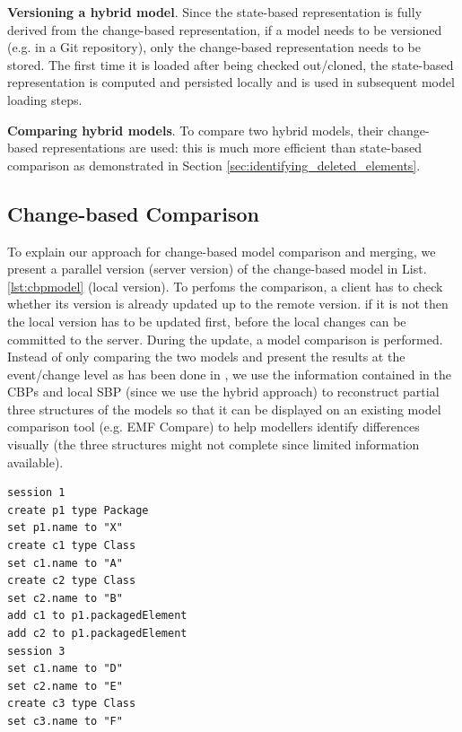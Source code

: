 \documentclass[sigplan,review,anonymous]{acmart}\settopmatter{printfolios=true,printccs=false,printacmref=false}
\begin{document}
\textbf{Versioning a hybrid model}. Since the state-based representation is fully derived from the change-based representation, if a model needs to be versioned (e.g. in a Git repository), only the change-based representation needs to be stored. The first time it is loaded after being checked out/cloned, the state-based representation is computed and persisted locally and is used in subsequent model loading steps.

\textbf{Comparing hybrid models}. To compare two hybrid models, their change-based representations are used: this is much more efficient than state-based comparison as demonstrated in Section \ref{sec:identifying_deleted_elements}.


\subsection{Change-based Comparison}
\label{sec:change-based_comparison}

To explain our approach for change-based model comparison and merging, we present a parallel version (server version) of the change-based model in List. \ref{lst:cbpmodel} (local version). To perfoms the comparison, a client has to check whether its version is already updated up to the remote version. if it is not then the local version has to be updated first, before the local changes can be committed to the server. During the update, a model comparison is performed. Instead of only comparing the two models and present the results at the event/change level as has been done in \cite{koegel2010emfstore}, we use the information contained in the CBPs and local  SBP (since we use the hybrid approach) to reconstruct partial three structures of the models so that it can be displayed on an existing model comparison tool (e.g. EMF Compare) to help modellers identify differences visually (the three structures might not complete since limited information available).  

\begin{lstlisting}[style=eol,caption={A parallel version of the CBP in List. \ref{lst:cbpmodel}.},label=lst:cbpmodel_parallel]
session 1
create p1 type Package
set p1.name to "X" 
create c1 type Class
set c1.name to "A"
create c2 type Class
set c2.name to "B"
add c1 to p1.packagedElement 
add c2 to p1.packagedElement
session 3
set c1.name to "D"
set c2.name to "E"
create c3 type Class
set c3.name to "F"
\end{lstlisting}
\end{document}

